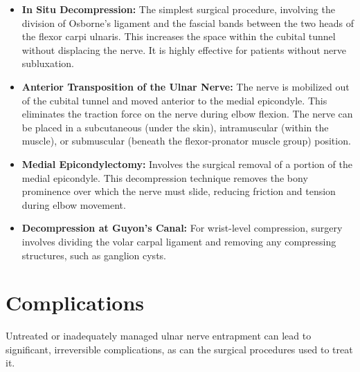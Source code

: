 \begin{itemize}
  \begin{itemize}
  \item \textbf{In Situ Decompression:} The simplest surgical procedure, involving the division of Osborne's ligament and the fascial bands between the two heads of the flexor carpi ulnaris. This increases the space within the cubital tunnel without displacing the nerve. It is highly effective for patients without nerve subluxation.
  \item \textbf{Anterior Transposition of the Ulnar Nerve:} The nerve is mobilized out of the cubital tunnel and moved anterior to the medial epicondyle. This eliminates the traction force on the nerve during elbow flexion. The nerve can be placed in a subcutaneous (under the skin), intramuscular (within the muscle), or submuscular (beneath the flexor-pronator muscle group) position.
  \item \textbf{Medial Epicondylectomy:} Involves the surgical removal of a portion of the medial epicondyle. This decompression technique removes the bony prominence over which the nerve must slide, reducing friction and tension during elbow movement.
  \item \textbf{Decompression at Guyon's Canal:} For wrist-level compression, surgery involves dividing the volar carpal ligament and removing any compressing structures, such as ganglion cysts.
  \end{itemize}
\end{itemize}

\section*{Complications}
Untreated or inadequately managed ulnar nerve entrapment can lead to significant, irreversible complications, as can the surgical procedures used to treat it.

